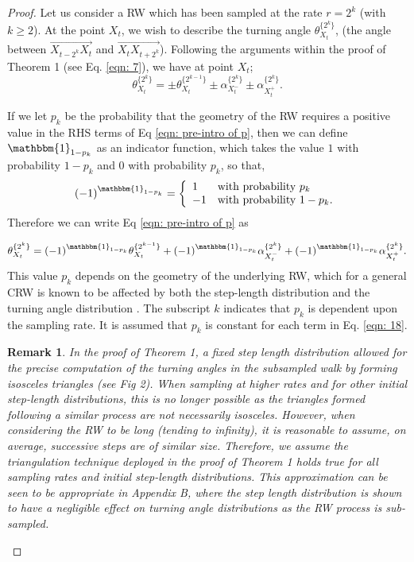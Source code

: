 \documentclass[english]{article}
\newtheorem{rem}{Remark}
\begin{document}
\begin{proof}
Let us consider a RW which has been sampled at the rate $r=2^k$ (with $k\geq 2$).  At the point $X_t$, we wish to describe the turning angle $\theta^{\{2^k\}}_{X_t}$, (the angle between $\overrightarrow{X_{t-2^k}X_t}$ and $\overrightarrow{X_tX_{t+2^k}}$). Following the arguments within the proof of Theorem 1 (see Eq. \ref{eqn: 7}), we have at point $X_t$;
\begin{equation}
   \theta_{X_t}^{\{2^{k}\}}=\pm\theta_{X_t}^{\{2^{k-1}\}}\pm\alpha_{X^-_t}^{\{2^{k}\}}\pm\alpha_{X^+_t}^{\{2^{k}\}}.
   \label{eqn: pre-intro of p}
\end{equation}

If we let $p_k$ be the probability that the geometry of the RW requires a positive value in the RHS terms of Eq \ref{eqn: pre-intro of p}, then we can define $\mathbbm{1}_{1-p_k}$ as an indicator function, which takes the value $1$ with probability $1-p_k$ and $0$ with probability $p_k$, so that,
\begin{equation} \nonumber
(-1)^{\mathbbm{1}_{1-p_k}} =\left\{ \begin{array}{ll}
    1 & \text{with probability } p_k
    \\ 
    -1 & \text{with probability } 1-p_k .
\end{array} \right.
\end{equation}
Therefore we can write Eq \ref{eqn: pre-intro of p} as

\begin{equation}
   \theta_{X_t}^{\{2^{k}\}}=(-1)^{\mathbbm{1}_{1-p_k}}\theta_{X_t}^{\{2^{k-1}\}}+(-1)^{\mathbbm{1}_{1-p_k}}\alpha_{X^-_t}^{\{2^{k}\}}+(-1)^{\mathbbm{1}_{1-p_k}}\alpha_{X^+_t}^{\{2^{k}\}} .
   \label{eqn: 18}
\end{equation}
This value $p_k$ depends on the geometry of the underlying RW, which for a general CRW is known to be affected by both the step-length distribution and the turning angle distribution \citep{benhamou2004reliably}.  The subscript $k$ indicates that $p_k$ is dependent upon the sampling rate.  It is assumed that $p_k$ is constant for each term in Eq. \ref{eqn: 18}.\\


\begin{rem}
In the proof of Theorem 1, a fixed step length distribution allowed for the precise computation of the turning angles in the subsampled walk by forming isosceles triangles (see Fig 2). When sampling at higher rates and for other initial step-length distributions, this is no longer possible as the triangles formed following a similar process are not necessarily isosceles. However, when considering the RW to be long (tending to infinity), it is reasonable to assume, on average, successive steps are of similar size. Therefore, we assume the triangulation technique deployed in the proof of Theorem 1 holds true for all sampling rates and initial step-length distributions.  This approximation can be seen to be appropriate in Appendix B, where the step length distribution is shown to have a negligible effect on turning angle distributions as the RW process is sub-sampled.
\end{rem}



\end{proof}
\end{document}
